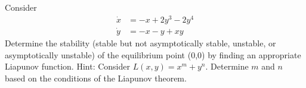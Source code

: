 \documentclass{exam}
\begin{document}
\begin{questions}
    \question[10]
        Consider
        \begin{equation*}
            \begin{aligned}
                \dot{x} &= -x + 2y^3 - 2y^4\\
                \dot{y} &= -x-y+xy
            \end{aligned}
        \end{equation*}
        Determine the stability (stable but not asymptotically stable, unstable, or asymptotically unstable) of the equilibrium point (0,0) by finding an appropriate Liapunov function. 
        Hint: Consider $L(x,y) = x^m + y^n$. Determine $m$ and $n$ based on the conditions of the Liapunov theorem.
\end{questions}
\end{document}
